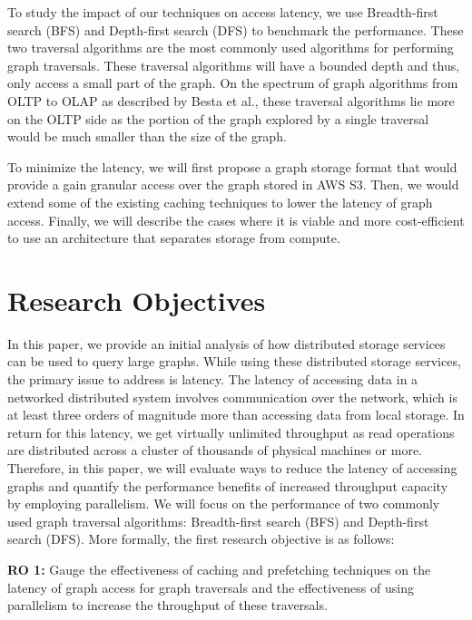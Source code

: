 \medskip
To study the impact of our techniques on access latency, we use
Breadth-first search (BFS) and Depth-first search (DFS) to
benchmark the performance. These two traversal algorithms are the most
commonly used algorithms for performing graph traversals\cite{sahu2017ubiquity}.
These traversal algorithms will have a bounded depth and thus, only
access a small part of the graph. On the spectrum of graph algorithms from OLTP
to OLAP as described by Besta et al.\cite{besta2023demystifying}, these 
traversal algorithms lie
more on the OLTP side as the portion of the graph explored by a single traversal
would be much smaller than the size of the graph.

\medskip
To minimize the latency, we will first propose a graph storage format that
would provide a gain granular access over the graph stored in AWS S3. Then, we
would extend some of the existing caching techniques to lower the latency of
graph access. Finally, we will describe the cases where it is viable and more
cost-efficient to use an architecture that separates storage from compute.

\section{Research Objectives}
In this paper, we provide an initial analysis of how distributed storage services can 
be used to query large graphs. While using these distributed storage services, the primary
issue to address is latency. The latency of accessing data in a networked
distributed system involves communication over the network, which is at least three orders of
magnitude more than accessing data from local storage. In return for this latency,
we get virtually unlimited throughput as read operations are distributed across a cluster 
of thousands of physical machines or more. Therefore, in this paper, we will evaluate ways to
reduce the latency of accessing graphs and quantify the performance
benefits of increased throughput capacity by employing parallelism. We will focus on the 
performance of two commonly used graph traversal algorithms: Breadth-first search 
(BFS) and Depth-first search (DFS). More formally, the first research
objective is as follows:
\begin{displayquote}
    \textbf{RO 1:} Gauge the effectiveness of caching and prefetching techniques
    on the latency of graph access for graph traversals and the effectiveness of
    using parallelism to increase the throughput of these traversals.
\end{displayquote}

